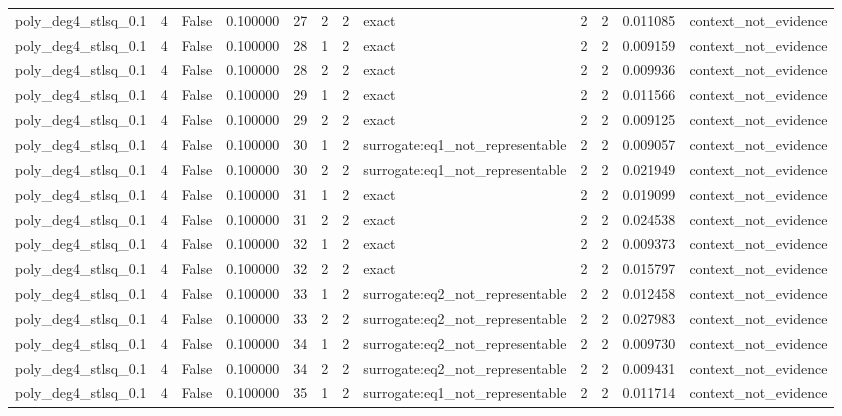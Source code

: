 \begin{tabular}{lrrrrrrlrrrl}
poly\_deg4\_stlsq\_0.1 & 4 & False & 0.100000 & 27 & 2 & 2 & exact & 2 & 2 & 0.011085 & context\_not\_evidence \\
poly\_deg4\_stlsq\_0.1 & 4 & False & 0.100000 & 28 & 1 & 2 & exact & 2 & 2 & 0.009159 & context\_not\_evidence \\
poly\_deg4\_stlsq\_0.1 & 4 & False & 0.100000 & 28 & 2 & 2 & exact & 2 & 2 & 0.009936 & context\_not\_evidence \\
poly\_deg4\_stlsq\_0.1 & 4 & False & 0.100000 & 29 & 1 & 2 & exact & 2 & 2 & 0.011566 & context\_not\_evidence \\
poly\_deg4\_stlsq\_0.1 & 4 & False & 0.100000 & 29 & 2 & 2 & exact & 2 & 2 & 0.009125 & context\_not\_evidence \\
poly\_deg4\_stlsq\_0.1 & 4 & False & 0.100000 & 30 & 1 & 2 & surrogate:eq1\_not\_representable & 2 & 2 & 0.009057 & context\_not\_evidence \\
poly\_deg4\_stlsq\_0.1 & 4 & False & 0.100000 & 30 & 2 & 2 & surrogate:eq1\_not\_representable & 2 & 2 & 0.021949 & context\_not\_evidence \\
poly\_deg4\_stlsq\_0.1 & 4 & False & 0.100000 & 31 & 1 & 2 & exact & 2 & 2 & 0.019099 & context\_not\_evidence \\
poly\_deg4\_stlsq\_0.1 & 4 & False & 0.100000 & 31 & 2 & 2 & exact & 2 & 2 & 0.024538 & context\_not\_evidence \\
poly\_deg4\_stlsq\_0.1 & 4 & False & 0.100000 & 32 & 1 & 2 & exact & 2 & 2 & 0.009373 & context\_not\_evidence \\
poly\_deg4\_stlsq\_0.1 & 4 & False & 0.100000 & 32 & 2 & 2 & exact & 2 & 2 & 0.015797 & context\_not\_evidence \\
poly\_deg4\_stlsq\_0.1 & 4 & False & 0.100000 & 33 & 1 & 2 & surrogate:eq2\_not\_representable & 2 & 2 & 0.012458 & context\_not\_evidence \\
poly\_deg4\_stlsq\_0.1 & 4 & False & 0.100000 & 33 & 2 & 2 & surrogate:eq2\_not\_representable & 2 & 2 & 0.027983 & context\_not\_evidence \\
poly\_deg4\_stlsq\_0.1 & 4 & False & 0.100000 & 34 & 1 & 2 & surrogate:eq2\_not\_representable & 2 & 2 & 0.009730 & context\_not\_evidence \\
poly\_deg4\_stlsq\_0.1 & 4 & False & 0.100000 & 34 & 2 & 2 & surrogate:eq2\_not\_representable & 2 & 2 & 0.009431 & context\_not\_evidence \\
poly\_deg4\_stlsq\_0.1 & 4 & False & 0.100000 & 35 & 1 & 2 & surrogate:eq1\_not\_representable & 2 & 2 & 0.011714 & context\_not\_evidence \\

\end{tabular}
